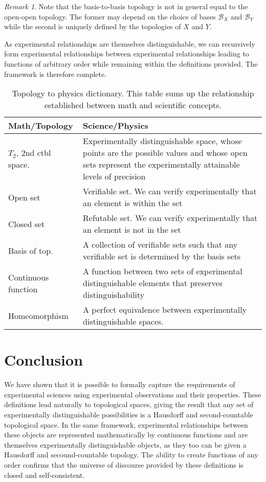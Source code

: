 \documentclass[review]{elsarticle}
\theoremstyle{plain}%
\theoremstyle{definition}
\theoremstyle{remark}
\newtheorem*{rem}{Remark}
\begin{document}
\begin{rem}
	Note that the basis-to-basis topology is not in general equal to the open-open topology. The former may depend on the choice of bases $\mathcal{B}_X$ and $\mathcal{B}_Y$ while the second is uniquely defined by the topologies of $X$ and $Y$.
\end{rem}

As experimental relationships are themselves distinguishable, we can recursively form experimental relationships between experimental relationships leading to functions of arbitrary order while remaining within the definitions provided. The framework is therefore complete.

\begin{table}[h]
	\centering
	\begin{tabular}{p{} p{}}
		Math/Topology & Science/Physics \\ 
		\hline 
		$T_2$, 2nd ctbl space. & Experimentally distinguishable space, whose points are the possible values and whose open sets represent the experimentally attainable levels of precision \\
		Open set & Verifiable set. We can verify experimentally that an element is within the set  \\ 
		Closed set & Refutable set. We can verify experimentally that an element is not in the set \\ 
		Basis of top. & A collection of verifiable sets such that any verifiable set is determined by the basis sets\\
		Continuous \newline function &  A function between two sets of experimental distinguishable elements that preserves distinguishability \\
		Homeomorphism &  A perfect equivalence between experimentally distinguishable spaces. \\
	\end{tabular} 
	\caption{Topology to physics dictionary. This table sums up the relationship established between math and scientific concepts.}
\end{table}


\section{Conclusion}

We have shown that it is possible to formally capture the requirements of experimental sciences using experimental observations and their properties. These definitions lead naturally to topological spaces, giving the result that any set of experimentally distinguishable possibilities is a Hausdorff and second-countable topological space. In the same framework, experimental relationships between these objects are represented mathematically by continuous functions and are themselves experimentally distinguishable objects, as they too can be given a Hausdorff and secound-countable topology. The ability to create functions of any order confirms that the universe of discourse provided by these definitions is closed and self-consistent.
\end{document}
